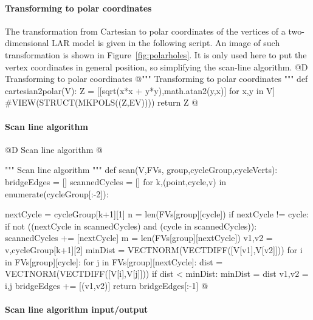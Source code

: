 \documentclass[11pt,oneside]{article}    %
\begin{document}
\paragraph{Transforming to polar coordinates}

The transformation from Cartesian to polar coordinates of the vertices of a two-dimensional LAR model is given in the following script. An image of such transformation is shown in Figure~\ref{fig:polarholes}. It is only used here to put the vertex coordinates in general position, so simplifying the scan-line algorithm.
@D Transforming to polar coordinates 
@{""" Transforming to polar coordinates """
def cartesian2polar(V):    
    Z = [[sqrt(x*x + y*y),math.atan2(y,x)] for x,y in V]
    #VIEW(STRUCT(MKPOLS((Z,EV))))
    return Z
@}


\paragraph{Scan line algorithm}
@D Scan line algorithm 
@{""" Scan line algorithm """
def scan(V,FVs, group,cycleGroup,cycleVerts):
    bridgeEdges = []
    scannedCycles = []
    for k,(point,cycle,v) in enumerate(cycleGroup[:-2]):
        
        nextCycle = cycleGroup[k+1][1]
        n = len(FVs[group][cycle])
        if nextCycle != cycle: 
            if not ((nextCycle in scannedCycles) and (cycle in scannedCycles)):
                scannedCycles += [nextCycle]
                m = len(FVs[group][nextCycle])
                v1,v2 = v,cycleGroup[k+1][2]
                minDist = VECTNORM(VECTDIFF([V[v1],V[v2]]))
                for i in FVs[group][cycle]:
                    for j in FVs[group][nextCycle]:
                        dist = VECTNORM(VECTDIFF([V[i],V[j]]))
                        if  dist < minDist: 
                            minDist = dist
                            v1,v2 = i,j
                bridgeEdges += [(v1,v2)]
    return bridgeEdges[:-1]
@}

\paragraph{Scan line algorithm input/output}
\end{document}
